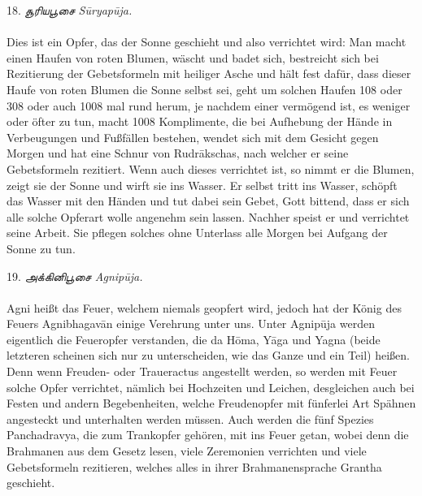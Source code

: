 \documentclass{article}
\newcommand{\TamilText}[1]{\texttamil{#1}}
\newcommand{\tam}[1]{\TamilText{#1}}
\begin{document}
\begin{center}
18. \emph{\tam{சூரியபூசை} S\={u}ryap\={u}ja.}
\end{center}
\paragraph{}
Dies ist ein Opfer, das der Sonne geschieht und also verrichtet wird: Man macht einen Haufen von roten Blumen, wäscht und badet sich, bestreicht sich bei Rezitierung der Gebetsformeln mit heiliger Asche und hält fest dafür, dass dieser Haufe von roten Blumen die Sonne selbst sei, geht um solchen Haufen 108 oder 308 oder auch 1008 mal rund herum, je nachdem einer vermögend ist, es weniger oder öfter zu tun, macht 1008 Komplimente, die bei Aufhebung der Hände in Verbeugungen und Fußfällen bestehen, wendet sich mit dem Gesicht gegen Morgen und hat eine Schnur von Rudr\={a}kschas, nach welcher er seine Gebetsformeln rezitiert. Wenn auch dieses verrichtet ist, so nimmt er die Blumen, zeigt sie der Sonne und wirft sie ins Wasser. Er selbst tritt ins Wasser, schöpft das Wasser mit den Händen und tut dabei sein Gebet, Gott bittend, dass er sich alle solche Opferart wolle angenehm sein lassen. Nachher speist er und verrichtet seine Arbeit. Sie pflegen solches ohne Unterlass alle Morgen bei Aufgang der Sonne zu tun.

\begin{center}
19. \emph{\tam{அக்கினிபூசை} Agnip\={u}ja.}
\end{center}
\paragraph{}
Agni heißt das Feuer, welchem niemals geopfert wird, jedoch hat der König des Feuers Agnibhagav\={a}n einige Verehrung unter uns. Unter Agnip\={u}ja werden eigentlich die Feueropfer verstanden, die da H\={o}ma, Y\={a}ga und Yagna (beide letzteren scheinen sich nur zu unterscheiden, wie das Ganze und ein Teil) heißen. Denn wenn Freuden- oder Traueractus angestellt werden, so werden mit Feuer solche Opfer verrichtet, nämlich bei Hochzeiten und Leichen, desgleichen auch bei Festen und andern Begebenheiten, welche Freudenopfer mit fünferlei Art Spähnen angesteckt und unterhalten werden müssen. Auch werden die fünf Spezies Panchadravya, die zum Trankopfer gehören, mit ins Feuer getan, wobei denn die Brahmanen aus dem Gesetz lesen, viele Zeremonien verrichten und viele Gebetsformeln rezitieren, welches alles in ihrer Brahmanensprache Grantha geschieht.
\end{document}
